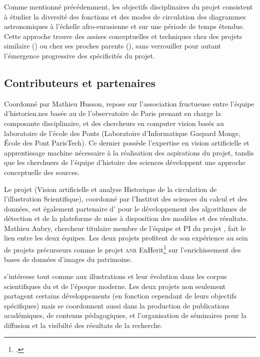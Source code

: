 Comme mentionné précédemment, les objectifs disciplinaires du projet
consistent à étudier la diversité des fonctions et des modes de
circulation des diagrammes astronomiques à l'échelle afro-eurasienne et
sur une période de temps étendue. Cette approche trouve des assises
conceptuelles et techniques chez des projets similaire (\vhs) ou chez ses
proches parents (\dishas), sans verrouiller pour autant l'émergence
progressive des spécificités du projet.

\hypertarget{contributeurs-et-partenaires}{%
\subsection{Contributeurs et
partenaires}\label{contributeurs-et-partenaires}}

Coordonné par Mathieu Husson, \eida repose sur l'association fructueuse
entre l'équipe d'historien.nes basée au \syrte de l'observatoire de Paris
prenant en charge la composante disciplinaire, et des chercheurs en
computer vision basés au laboratoire \imagine de l'école des Ponts
(Laboratoire d'Informatique Gaspard Monge, École des Pont ParisTech). Ce
dernier possède l'expertise en vision artificielle et apprentissage
machine nécessaire à la réalisation des aspirations du projet, tandis
que les cherchuers de l'équipe d'histoire des sciences développent une
approche conceptuelle des sources.

Le projet \vhs (Vision artificielle et analyse Historique de la
circulation de l'illustration Scientifique), coordonné par l'Institut
des sciences du calcul et des données, est également partenaire d'\eida
pour le développement des algorithmes de détection et de la plateforme
de mise à disposition des modèles et des résultats. Mathieu Aubry,
chercheur titulaire membre de l'équipe \imagine et PI du projet \vhs, fait
le lien entre les deux équipes. Les deux projets profitent de son
expérience au sein de projets précurseurs comme le projet \textsc{anr}
EnHerit\footcite{noauthor_enhancing_nodate} sur
l'enrichissement des bases de données d'images du patrimoine.

\vhs s'intéresse tout comme \eida aux illustrations et leur évolution dans
les corpus scientifiques du \ma et de l'époque moderne. Les deux projets
non seulement partagent certains développements (en fonction cependant
de leurs objectifs spécifiques) mais se coordonnent aussi dans la
production de publications académiques, de contenus pédagogiques, et
l'organisation de séminaires pour la diffusion et la visibilté des
résultats de la recherche.

